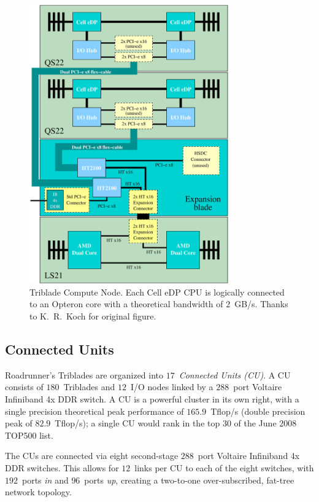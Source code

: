 \documentclass[journal,twoside]{IEEEtran}
\begin{document}
\begin{figure}
\begin{center}
\includegraphics[width=3.375in]{figs/triblade.eps}
\caption{Triblade Compute Node.  Each Cell eDP CPU is logically
connected to an Opteron core with a theoretical bandwidth of
$2$~GB/s.  Thanks to K.~R.~Koch for original figure.}
\label{fig:triblade}
\end{center}
\end{figure}

\subsection{Connected Units}

Roadrunner's Triblades are organized into $17$~\emph{Connected Units
(CU)}.  A CU consists of $180$~Triblades and $12$~I/O nodes linked by
a $288$~port Voltaire Infiniband 4x DDR switch.  A CU is a powerful
cluster in its own right, with a single precision theoretical peak
performance of $165.9$~Tflop/s (double precision peak of
$82.9$~Tflop/s); a single CU would rank in the top $30$ of the June
2008 TOP500 list.

The CUs are connected via eight second-stage $288$~port Voltaire
Infiniband 4x DDR switches.  This allows for $12$~links per CU to each
of the eight switches, with $192$~ports \emph{in} and $96$~ports
\emph{up}, creating a two-to-one over-subscribed, fat-tree network
topology.
\end{document}
